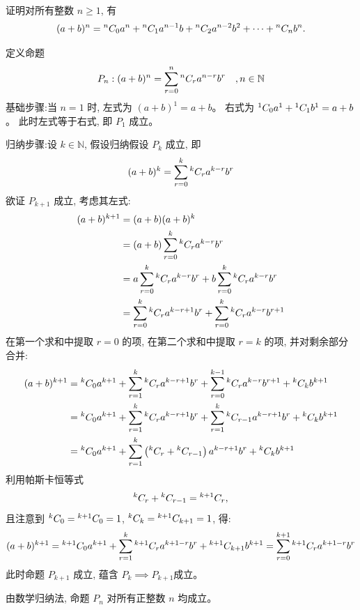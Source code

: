 \begin{questions}
    \question 证明对所有整数 $n \ge 1$, 有
    \[
    (a+b)^n = {}^{n}C_{0} a^n + {}^{n}C_{1} a^{n-1}b + {}^{n}C_{2} a^{n-2}b^2 + \dots + {}^{n}C_{n} b^n.
    \]
    \begin{solution}
        定义命题 
        \[
        P_n:(a+b)^n = \sum_{r=0}^{n} {}^{n}C_{r} a^{n-r}b^r \quad, n \in \mathbb{N}
        \]
        基础步骤:当 $n=1$ 时, 
        左式为 $(a+b)^1 = a+b$。
        右式为 ${}^{1}C_{0} a^1 + {}^{1}C_{1} b^1 = a+b$。
        此时左式等于右式, 即 $P_1$ 成立。

        归纳步骤:设 $k \in \mathbb{N}$, 假设归纳假设 $P_k$ 成立, 即
        \[
        (a+b)^k = \sum_{r=0}^{k} {}^{k}C_{r} a^{k-r}b^r
        \]
        欲证 $P_{k+1}$ 成立, 考虑其左式:
        \begin{align}
        (a+b)^{k+1} &= (a+b)(a+b)^k \\
        &= (a+b) \sum_{r=0}^{k} {}^{k}C_{r} a^{k-r}b^r \\
        &= a \sum_{r=0}^{k} {}^{k}C_{r} a^{k-r}b^r + b \sum_{r=0}^{k} {}^{k}C_{r} a^{k-r}b^r \\
        &= \sum_{r=0}^{k} {}^{k}C_{r} a^{k-r+1}b^r + \sum_{r=0}^{k} {}^{k}C_{r} a^{k-r}b^{r+1}
        \end{align}
        在第一个求和中提取 $r=0$ 的项, 在第二个求和中提取 $r=k$ 的项, 并对剩余部分合并:
        \begin{align}
        (a+b)^{k+1} &= {}^{k}C_{0} a^{k+1} + \sum_{r=1}^{k} {}^{k}C_{r} a^{k-r+1}b^r + \sum_{r=0}^{k-1} {}^{k}C_{r} a^{k-r}b^{r+1} + {}^{k}C_{k} b^{k+1} \\
        &= {}^{k}C_{0} a^{k+1} + \sum_{r=1}^{k} {}^{k}C_{r} a^{k-r+1}b^r + \sum_{r=1}^{k} {}^{k}C_{r-1} a^{k-r+1}b^r + {}^{k}C_{k} b^{k+1} \\
        &= {}^{k}C_{0} a^{k+1} + \sum_{r=1}^{k} \left( {}^{k}C_{r} + {}^{k}C_{r-1} \right) a^{k-r+1}b^r + {}^{k}C_{k} b^{k+1}
        \end{align}
        利用帕斯卡恒等式 
        \[
        {}^{k}C_{r} + {}^{k}C_{r-1} = {}^{k+1}C_{r}, 
        \]
        且注意到 ${}^{k}C_{0} = {}^{k+1}C_{0} = 1$, ${}^{k}C_{k} = {}^{k+1}C_{k+1} = 1$, 得:
        \[
        (a+b)^{k+1} = {}^{k+1}C_{0} a^{k+1} + \sum_{r=1}^{k} {}^{k+1}C_{r} a^{k+1-r}b^r + {}^{k+1}C_{k+1} b^{k+1} = \sum_{r=0}^{k+1} {}^{k+1}C_{r} a^{k+1-r}b^r
        \]
        此时命题 $P_{k+1}$ 成立, 蕴含 $P_k \implies P_{k+1}$成立。

        由数学归纳法, 命题 $P_n$ 对所有正整数 $n$ 均成立。
    \end{solution}


\end{questions}
